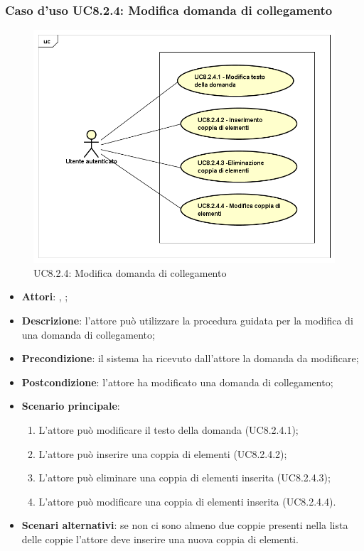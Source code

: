 \subsubsection{Caso d'uso UC8.2.4: Modifica domanda di collegamento}
\label{UC8.2.4}
\begin{figure}[ht]
	\centering
	\includegraphics[scale=0.5,keepaspectratio]{UML/UC8_2_4.png}
	\caption{UC8.2.4: Modifica domanda di collegamento}
\end{figure}
\FloatBarrier
\begin{itemize}
	\item \textbf{Attori}: \uau, \uaupro;
	\item \textbf{Descrizione}: l'attore può utilizzare la procedura guidata per la modifica di una domanda di collegamento; 
	\item \textbf{Precondizione}: il sistema ha ricevuto dall'attore la domanda da modificare; 
	\item \textbf{Postcondizione}: l'attore ha modificato una domanda di collegamento;
	\item \textbf{Scenario principale}: 
	\begin{enumerate}
			\item L'attore può modificare il testo della domanda (UC8.2.4.1);
			\item L'attore può inserire una coppia di elementi (UC8.2.4.2);
			\item L'attore può eliminare una coppia di elementi inserita (UC8.2.4.3);
			\item L'attore può modificare una coppia di elementi inserita (UC8.2.4.4).
		\end{enumerate}
	\item \textbf{Scenari alternativi}: se non ci sono almeno due coppie presenti nella lista delle coppie l'attore deve inserire una nuova coppia di elementi.
\end{itemize}

